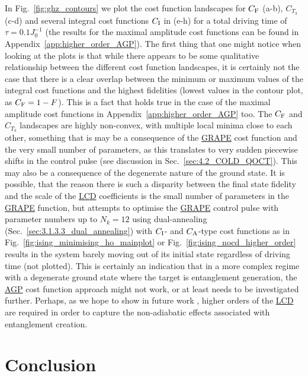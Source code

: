 \documentclass[a4paper,oneside,11pt]{book}
\newcommand{\acrref}[1]{\hyperref[acr:#1]{#1}}
\begin{document}
In Fig.~\ref{fig:ghz_contours} we plot the cost function landscapes for $C_{\rm F}$ (a-b), $C_{T_3}$ (c-d) and several integral cost functions $C_{\rm I}$ in (e-h) for a total driving time of $\tau = 0.1J_0^{-1}$ (the results for the maximal amplitude cost functions can be found in Appendix~\ref{app:higher_order_AGP}). The first thing that one might notice when looking at the plots is that while there appears to be some qualitative relationship between the different cost function landscapes, it is certainly not the case that there is a clear overlap between the minimum or maximum values of the integral cost functions and the highest fidelities (lowest values in the contour plot, as $C_{\rm F} = 1 - F$). This is a fact that holds true in the case of the maximal amplitude cost functions in Appendix~\ref{app:higher_order_AGP} too. The $C_{\rm F}$ and $C_{T_3}$ landscapes are highly non-convex, with multiple local minima close to each other, something that is may be a consequence of the \acrref{GRAPE} cost function and the very small number of parameters, as this translates to very sudden piecewise shifts in the control pulse (see discussion in Sec.~\ref{sec:4.2_COLD_QOCT}). This may also be a consequence of the degenerate nature of the ground state. It is possible, that the reason there is such a disparity between the final state fidelity and the scale of the \acrref{LCD} coefficients is the small number of parameters in the \acrref{GRAPE} function, but attempts to optimise the \acrref{GRAPE} control pulse with parameter numbers up to $N_k = 12$ using dual-annealing (Sec.~\ref{sec:3.1.3.3_dual_annealing}) with $C_{\rm I}$- and $C_{\rm A}$-type cost functions as in Fig.~\ref{fig:ising_minimising_ho_mainplot} or Fig.~\ref{fig:ising_nocd_higher_order} results in the system barely moving out of its initial state regardless of driving time (not plotted). This is certainly an indication that in a more complex regime with a degenerate ground state where the target is entanglement generation, the \acrref{AGP} cost function approach might not work, or at least needs to be investigated further. Perhaps, as we hope to show in future work \cite{lawrence_numerical_2023}, higher orders of the \acrref{LCD} are required in order to capture the non-adiabatic effects associated with entanglement creation.


\part{Conclusion}\label{part:conclusion}
\end{document}
